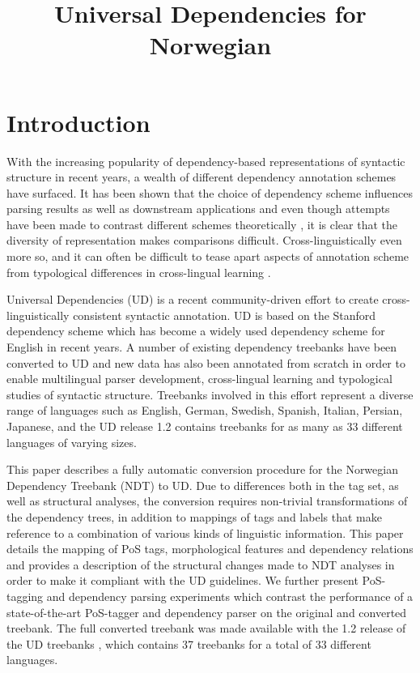 \documentclass[10pt, a4paper]{article}
\title{Universal Dependencies for Norwegian}
\date{}
\begin{document}
\maketitleabstract

\section{Introduction}
With the increasing popularity of dependency-based representations of
syntactic structure in recent years, a wealth of different dependency
annotation schemes have surfaced. It has been shown that the choice of
dependency scheme influences parsing results \cite{Sch:Abe:Rap:12} as
well as downstream applications \cite{Elm:Joh:Kle:13} and even though
attempts have been made to contrast different schemes theoretically
\cite{Iva:Oep:Ovr:12}, it is clear that the diversity of
representation makes comparisons difficult. Cross-linguistically even
more so, and it can often be difficult to tease apart
aspects of annotation scheme from typological differences in cross-lingual learning \cite{Soe:11,Skj:Ovr:12}.

Universal Dependencies (UD) \cite{Mar:Doz:Sil:14,Niv:15} is a recent
community-driven effort to create cross-linguistically consistent
syntactic annotation. UD is based on the Stanford dependency scheme
\cite{Mar:Mac:Man:06} which has become a widely used dependency scheme
for English in recent years.  A number of existing dependency
treebanks have been converted to UD \cite{Pyy:Kan:Miss:15,Niv:14}
and new data has also been annotated from scratch in order to enable
multilingual parser development, cross-lingual learning and
typological studies of syntactic structure. Treebanks involved in this
effort represent a diverse range of languages such as English, German,
Swedish, Spanish, Italian, Persian, Japanese, and the UD release 1.2
contains treebanks for as many as 33 different languages of varying
sizes.

This paper describes a fully automatic conversion procedure for the
Norwegian Dependency Treebank (NDT) to UD. Due to differences both in
the tag set, as well as structural analyses, the conversion requires
non-trivial transformations of the dependency trees, in addition to
mappings of tags and labels that make reference to a combination of
various kinds of linguistic information.  This paper details the
mapping of PoS tags, morphological features and dependency relations
and provides a description of the structural changes made to NDT
analyses in order to make it compliant with the UD guidelines. We
further present PoS-tagging and dependency parsing experiments which
contrast the performance of a state-of-the-art PoS-tagger and
dependency parser on the original and converted treebank. The full converted
treebank was made available with the 1.2 release of the UD treebanks
\cite{Niv:Mar:Gin:16}, which contains 37 treebanks for a total of 33 different languages.
\end{document}
